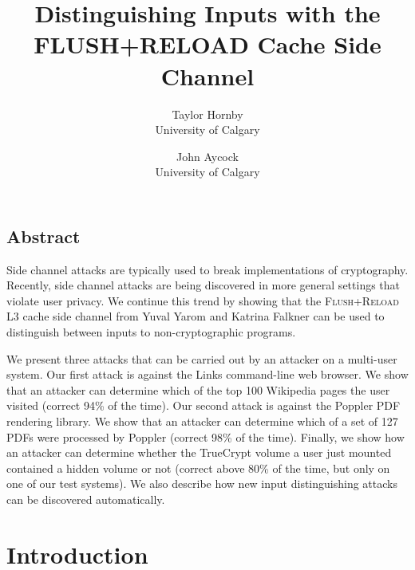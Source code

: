 \documentclass[letterpaper,twocolumn,10pt]{article}
\begin{document}
\date{}

\title{\Large \bf Distinguishing Inputs with the FLUSH+RELOAD Cache Side Channel}

\author{
{\rm Taylor Hornby}\\
University of Calgary
\and
{\rm John Aycock}\\
University of Calgary
} %

\maketitle

\thispagestyle{empty}


\subsection*{Abstract}
Side channel attacks are typically used to break implementations of
cryptography. Recently, side channel attacks are being discovered in more
general settings that violate user privacy. We continue this trend by showing
that the \textsc{Flush+Reload} L3 cache side channel from Yuval Yarom and
Katrina Falkner \cite{yarom2013flush} can be used to distinguish between inputs
to non-cryptographic programs. 

We present three attacks that can be carried out by an attacker on a multi-user
system. Our first attack is against the Links command-line web browser. We show
that an attacker can determine which of the top 100 Wikipedia pages the user
visited (correct 94\% of the time). Our second attack is against the Poppler PDF
rendering library. We show that an attacker can determine which of a set of 127
PDFs were processed by Poppler (correct 98\% of the time). Finally, we show how
an attacker can determine whether the TrueCrypt volume a user just mounted
contained a hidden volume or not (correct above 80\% of the time, but only on
one of our test systems). We also describe how new input distinguishing attacks
can be discovered automatically.

\section{Introduction}
\label{sec:intro}
\end{document}
